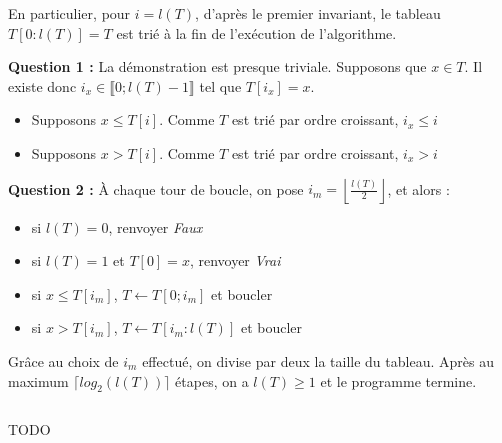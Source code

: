 \documentclass[../main.tex]{subfiles}
\begin{document}
En particulier, pour $i = l(T)$, d'après le premier invariant, le tableau $T[0:l(T)] = T$ est trié à la fin de l'exécution de l'algorithme.


\textbf{Question 1 :} La démonstration est presque triviale. Supposons que $x\in T$. Il existe donc $i_x\in \llbracket{0; l(T)-1}\rrbracket$ tel que $T[i_x] = x$. 
\begin{itemize}
	\item Supposons $x\leq T[i]$. Comme $T$ est trié par ordre croissant, $i_x \leq i$
	\item Supposons $x > T[i]$. Comme $T$ est trié par ordre croissant, $i_x > i$ 
\end{itemize}
\textbf{Question 2 :} À chaque tour de boucle, on pose $i_m = \left\lfloor \frac{l(T)}{2}\right\rfloor$, et alors :
\begin{itemize}
	\item si $l(T) = 0$, renvoyer \textit{Faux}
	\item si $l(T) = 1$ et $T[0] = x$, renvoyer \textit{Vrai}
	\item si $x\leq T[i_m]$, $T\leftarrow T[0; i_m]$ et boucler
	\item si $x > T[i_m]$, $T\leftarrow T[i_m:l(T)]$ et boucler
\end{itemize}
Grâce au choix de $i_m$ effectué, on divise par deux la taille du tableau. Après au maximum $\lceil log_2(l(T))\rceil$ étapes, on a $l(T) \geq 1$ et le programme termine.
\inputminted{c}{solutions/dichotomique.c}
TODO


\end{document}
